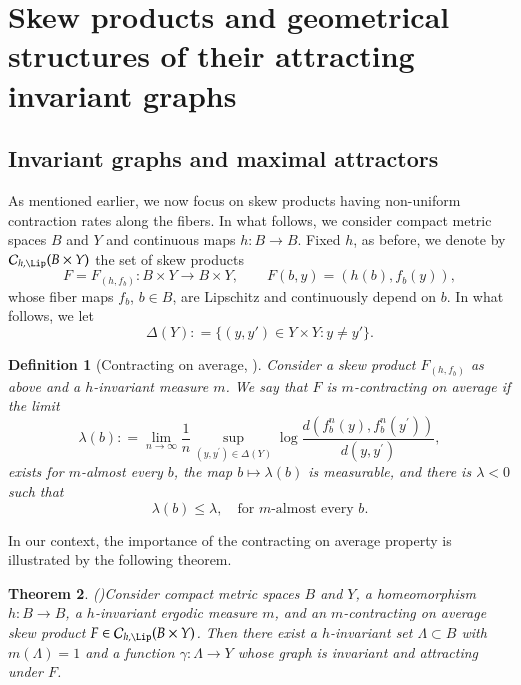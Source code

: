 \documentclass[11pt,reqno]{amsart}
\theoremstyle{plain}
\newtheorem{theorem}{Theorem}[section]
\newtheorem{definition}[theorem]{Definition}
\newtheorem*{theorem A}{Theorem A}
\newtheorem*{theorem B}{Theorem B}
\newtheorem*{theorem C}{Theorem C}
\newtheorem*{theorem 1}{Theorem 1}
\newtheorem*{theorem 2}{Theorem 2}
\newtheorem*{theorem 3}{Theorem 3}
\numberwithin{equation}{section}
\begin{document}
\section{Skew products and geometrical structures of their attracting invariant graphs}\label{sec3}

\subsection{Invariant graphs and maximal attractors}

As mentioned earlier, we now focus on skew products having non-uniform contraction rates along the fibers.
In what follows, we consider compact metric spaces $B$ and $Y$ and continuous maps $h \colon B \to B$.
Fixed $h$, as before, we denote by $\mathcal{C}_{h,\Lip}(B\times Y)$ the set of skew products
\begin{equation}
\label{e.asin}
F=F_{(h,f_b)} \colon B\times Y \to B \times Y, \qquad
F(b,y) =(h(b), f_b(y)),
\end{equation}
whose fiber maps $f_b$, $b \in B$, are Lipschitz and continuously depend on $b$.
In what follows, we let
$$
\Delta (Y) : = \{(y,y') \in Y \times Y \colon y\ne y' \}.
$$

\begin{definition}[Contracting on average, \cite{stark1999regularity}]\label{average}
Consider a skew product $F_{(h, f_b)}$ as above and a $h$-invariant measure $m$. We say that $F$ is \emph{$m$-contracting on average} if the limit
\begin{equation}\label{777}
\lambda(b) : = \lim_{n \to \infty}\frac{1}{n}\sup_{(y,y^{\prime})\in \Delta (Y)}\log \frac{d(f_b^n(y), f_b^n(y^{\prime}))}{d(y,y^{\prime})},
\end{equation}
exists for $m$-almost every $b$, the map $b \mapsto \lambda(b)$ is measurable, and there is $\lambda<0$ such that
\begin{equation}\label{landa}
 \lambda(b)\leq \lambda, \quad \text{for $m$-almost every $b$.}
\end{equation}
\end{definition}

In our context, the importance of the contracting on average property is illustrated by the following theorem.

\begin{theorem}{\em{(\cite[Theorem 1.4]{stark1999regularity})}}\label{thmg}
Consider compact metric spaces $B$ and $Y$, a homeomorphism $h\colon B \to B$, a $h$-invariant ergodic measure $m$, and an $m$-contracting on average skew product $F\in \mathcal{C}_{h, \Lip}(B\times Y)$.
Then there exist a $h$-invariant set $\Lambda \subset B$ with $m(\Lambda)= 1$ and a function $\gamma \colon \Lambda \to Y$ whose graph is invariant and attracting under $F$.
\end{theorem}
\end{document}
